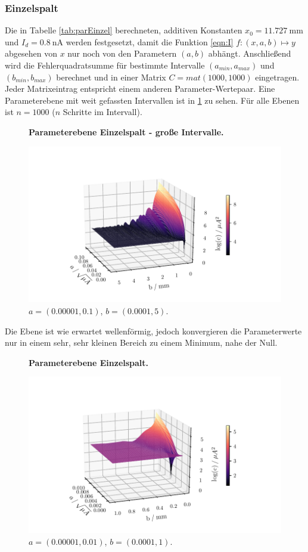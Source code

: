 \subsubsection{Einzelspalt}
Die in Tabelle \ref{tab:parEinzel} berechneten, additiven Konstanten $x_0 = \SI{11.727}{\milli\meter}$ und $I_d = \SI{0.8}{\nano\ampere}$ werden festgesetzt,
damit die Funktion \eqref{eqn:I} $f:(x,a,b)\mapsto y$ abgesehen von $x$ nur noch von den Parametern $(a,b)$ abhängt.
Anschließend wird die Fehlerquadratsumme für bestimmte Intervalle $(a_{min}, a_{max})$ und $(b_{min}, b_{max})$ berechnet und in einer Matrix $C = mat(1000, 1000)$ eingetragen.
Jeder Matrixeintrag entspricht einem anderen Parameter-Wertepaar.
Eine Parameterebene mit weit gefassten Intervallen ist in \ref{fig:ls1} zu sehen.
Für alle Ebenen ist $n = 1000$ ($n$ Schritte im Intervall).

\begin{figure}
    \centering
    \textbf{Parameterebene Einzelspalt - große Intervalle.}\par\medskip
    \includegraphics[width=.9\textwidth]{python/leastSquares.pdf}
    \caption{$a = (0.00001, 0.1)$, $b = (0.0001, 5)$.}
    \label{fig:ls1}
\end{figure}

Die Ebene ist wie erwartet wellenförmig, jedoch konvergieren die Parameterwerte nur in einem sehr, sehr kleinen Bereich zu einem Minimum, nahe der Null.

\begin{figure}
    \centering
    \textbf{Parameterebene Einzelspalt.}\par\medskip
    \includegraphics[width=.9\textwidth]{python/leastSquares2.pdf}
    \caption{$a = (0.00001, 0.01)$, $b = (0.0001, 1)$.}
    \label{fig:ls2}
\end{figure}

